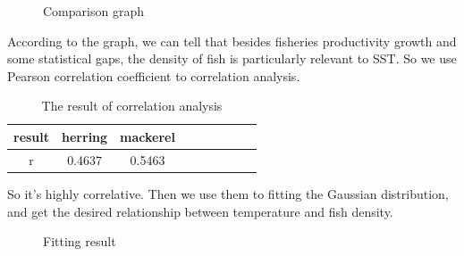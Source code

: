 \documentclass{mcmthesis}
\begin{document}
 \begin{figure}[htbp]
\caption{Comparison graph}\label{figure1}
 \end{figure}

  According to the graph, we can tell that besides fisheries productivity growth and some statistical gaps, the density of fish is particularly relevant to SST. So we use Pearson correlation coefficient to correlation analysis. 

  \begin{table}[h]
    \centering
    \setlength{\abovecaptionskip}{0pt}%
    \setlength{\belowcaptionskip}{15pt}%
    \caption{The result of correlation analysis}
    \begin{tabular}{ccccccccc}
    \toprule[1.5pt]
    result &herring &mackerel\\
    \toprule[1.5pt]
    r&0.4637&0.5463\\
    \bottomrule[1.5pt]
    \end{tabular}
  \end{table}

  So it's highly correlative. Then we use them to fitting the Gaussian distribution, and get the desired relationship between temperature and fish density.

 \begin{figure}[htbp]
   \caption{Fitting result}\label{figure1}
 \end{figure}
\end{document}
